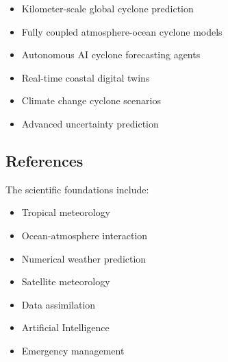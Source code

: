 \begin{itemize}

\item Kilometer-scale global cyclone prediction

\item Fully coupled atmosphere-ocean cyclone models

\item Autonomous AI cyclone forecasting agents

\item Real-time coastal digital twins

\item Climate change cyclone scenarios

\item Advanced uncertainty prediction

\end{itemize}



\subsection{References}

The scientific foundations include:

\begin{itemize}

\item Tropical meteorology

\item Ocean-atmosphere interaction

\item Numerical weather prediction

\item Satellite meteorology

\item Data assimilation

\item Artificial Intelligence

\item Emergency management

\end{itemize}



